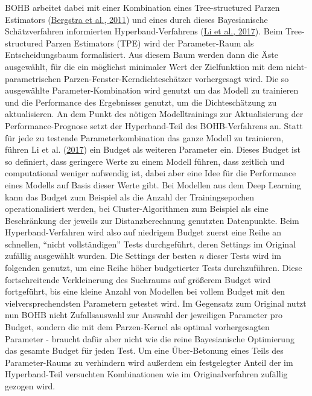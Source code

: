 \documentclass[
  12pt,
]{book}
\begin{document}
BOHB arbeitet dabei mit einer Kombination eines Tree-structured Parzen Estimators (\protect\hyperlink{ref-bergstraAlgorithmsHyperParameterOptimization2011}{Bergstra et al., 2011}) und eines durch dieses Bayesianische Schätzverfahren informierten Hyperband-Verfahrens (\protect\hyperlink{ref-liHyperbandBanditbasedConfiguration2017}{Li et al., 2017}). Beim Tree-structured Parzen Estimators (TPE) wird der Parameter-Raum als Entscheidungsbaum formalisiert. Aus diesem Baum werden dann die Äste ausgewählt, für die ein möglichst minimaler Wert der Zielfunktion mit dem nicht-parametrischen Parzen-Fenster-Kerndichteschätzer vorhergesagt wird. Die so ausgewählte Parameter-Kombination wird genutzt um das Modell zu trainieren und die Performance des Ergebnisses genutzt, um die Dichteschätzung zu aktualisieren.
An dem Punkt des nötigen Modelltrainings zur Aktualisierung der Performance-Prognose setzt der Hyperband-Teil des BOHB-Verfahrens an. Statt für jede zu testende Parameterkombination das ganze Modell zu trainieren, führen Li et al. (\protect\hyperlink{ref-liHyperbandBanditbasedConfiguration2017}{2017}) ein Budget als weiteren Parameter ein. Dieses Budget ist so definiert, dass geringere Werte zu einem Modell führen, dass zeitlich und computational weniger aufwendig ist, dabei aber eine Idee für die Performance eines Modells auf Basis dieser Werte gibt. Bei Modellen aus dem Deep Learning kann das Budget zum Beispiel als die Anzahl der Trainingsepochen operationalisiert werden, bei Cluster-Algorithmen zum Beispiel als eine Beschränkung der jeweils zur Distanzberechnung genutzten Datenpunkte. Beim Hyperband-Verfahren wird also auf niedrigem Budget zuerst eine Reihe an schnellen, ``nicht vollständigen'' Tests durchgeführt, deren Settings im Original zufällig ausgewählt wurden. Die Settings der besten \emph{n} dieser Tests wird im folgenden genutzt, um eine Reihe höher budgetierter Tests durchzuführen. Diese fortschreitende Verkleinerung des Suchraums auf größerem Budget wird fortgeführt, bis eine kleine Anzahl von Modellen bei vollem Budget mit den vielversprechendsten Parametern getestet wird.
Im Gegensatz zum Original nutzt nun BOHB nicht Zufallsauswahl zur Auswahl der jeweiligen Parameter pro Budget, sondern die mit dem Parzen-Kernel als optimal vorhergesagten Parameter - braucht dafür aber nicht wie die reine Bayesianische Optimierung das gesamte Budget für jeden Test.
Um eine Über-Betonung eines Teils des Parameter-Raums zu verhindern wird außerdem ein festgelegter Anteil der im Hyperband-Teil versuchten Kombinationen wie im Originalverfahren zufällig gezogen wird.
\end{document}
